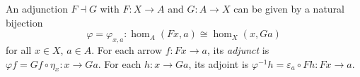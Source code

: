 An adjunction $F \dashv G$ with $F: X \to A$ and $G: A \to X$ can be given by a natural bijection
$$\varphi = \varphi_{x,a}: \hom_A(Fx, a) \cong \hom_X(x, Ga)$$
for all $x \in X$, $a \in A$. For each arrow $f: Fx \to a$, its \emph{adjunct} is $\varphi f = Gf \circ \eta_x: x \to Ga$. For each $h: x \to Ga$, its adjoint is $\varphi^{-1} h = \varepsilon_a \circ Fh: Fx \to a$.
